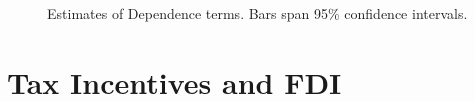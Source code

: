\documentclass[reqno,onecolumn,letterpaper,12pt]{article}
\newcommand{\R}{\texttt{R}} %
\begin{document}
{\begin{figure}[!h]
\begin{tabular}{@{\hskip -.05cm}c@{\hskip .1cm}c@{\hskip .1cm}c}
\end{tabular}
\caption{\label{fig:q25netterms} Estimates of Dependence terms. Bars span 95\% confidence intervals. }
\end{figure}









\section{Tax Incentives and FDI}\label{taxresults}

}
\end{document}
